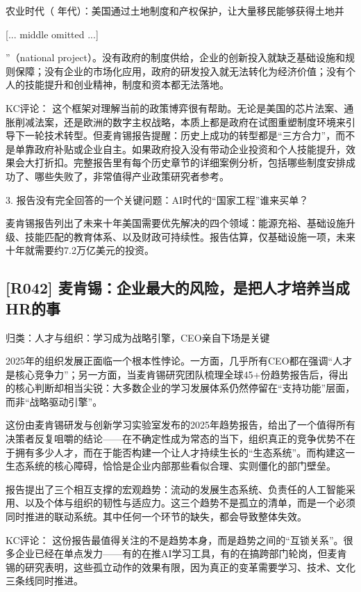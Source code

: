 \documentclass[11pt]{ctexart}
\begin{document}
农业时代（ 年代）：美国通过土地制度和产权保护，让大量移民能够获得土地并

[... middle omitted ...]

”（national project）。没有政府的制度供给，企业的创新投入就缺乏基础设施和规则保障；没有企业的市场化应用，政府的研发投入就无法转化为经济价值；没有个人的技能提升和创业精神，制度和资本都无法落地。

KC评论： 这个框架对理解当前的政策博弈很有帮助。无论是美国的芯片法案、通胀削减法案，还是欧洲的数字主权战略，本质上都是政府在试图重塑制度环境来引导下一轮技术转型。但麦肯锡报告提醒：历史上成功的转型都是“三方合力”，而不是单靠政府补贴或企业自主。如果政府投入没有带动企业投资和个人技能提升，效果会大打折扣。完整报告里有每个历史章节的详细案例分析，包括哪些制度安排成功了、哪些失败了，非常值得产业政策研究者参考。

3. 报告没有完全回答的一个关键问题：AI时代的“国家工程”谁来买单？

麦肯锡报告列出了未来十年美国需要优先解决的四个领域：能源充裕、基础设施升级、技能匹配的教育体系、以及财政可持续性。报告估算，仅基础设施一项，未来十年就需要约7.2万亿美元的投资。

\subsection{[R042] 麦肯锡：企业最大的风险，是把人才培养当成HR的事}
{\small\color{refgray}归类：人才与组织：学习成为战略引擎，CEO亲自下场是关键}

2025年的组织发展正面临一个根本性悖论。一方面，几乎所有CEO都在强调“人才是核心竞争力”；另一方面，当麦肯锡研究团队梳理全球45+份趋势报告后，得出的核心判断却相当尖锐：大多数企业的学习发展体系仍然停留在“支持功能”层面，而非“战略驱动引擎”。

这份由麦肯锡研发与创新学习实验室发布的2025年趋势报告，给出了一个值得所有决策者反复咀嚼的结论——在不确定性成为常态的当下，组织真正的竞争优势不在于拥有多少人才，而在于能否构建一个让人才持续生长的“生态系统”。而构建这一生态系统的核心障碍，恰恰是企业内部那些看似合理、实则僵化的部门壁垒。

报告提出了三个相互支撑的宏观趋势：流动的发展生态系统、负责任的人工智能采用、以及个体与组织的韧性与适应力。这三个趋势不是孤立的清单，而是一个必须同时推进的联动系统。其中任何一个环节的缺失，都会导致整体失效。

KC评论： 这份报告最值得关注的不是趋势本身，而是趋势之间的“互锁关系”。很多企业已经在单点发力——有的在推AI学习工具，有的在搞跨部门轮岗，但麦肯锡的研究表明，这些孤立动作的效果有限，因为真正的变革需要学习、技术、文化三条线同时推进。
\end{document}

